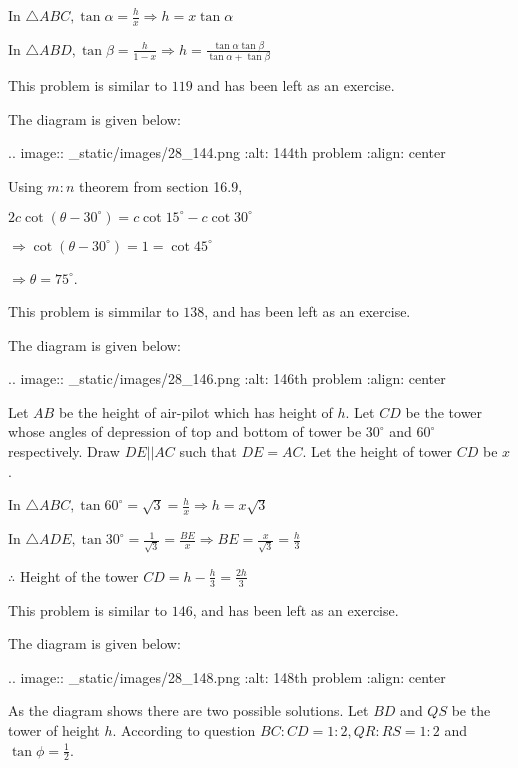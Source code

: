   In $\triangle ABC, \tan\alpha = \frac{h}{x} \Rightarrow h = x\tan\alpha$

  In $\triangle ABD, \tan\beta = \frac{h}{1 - x} \Rightarrow h =
  \frac{\tan\alpha\tan\beta}{\tan\alpha + \tan\beta}$

\item This problem is similar to $119$ and has been left as an exercise.

\item The diagram is given below:

  .. image:: _static/images/28_144.png
  :alt: 144th problem
  :align: center

  Using $m:n$ theorem from section 16.9,

  $2c\cot(\theta - 30^\circ) = c\cot15^\circ - c\cot30^\circ$

  $\Rightarrow \cot(\theta - 30^\circ) = 1 = \cot45^\circ$

  $\Rightarrow \theta = 75^\circ$.

\item This problem is simmilar to $138$, and has been left as an exercise.

\item The diagram is given below:

  .. image:: _static/images/28_146.png
  :alt: 146th problem
  :align: center

  Let $AB$ be the height of air-pilot which has height of $h$. Let $CD$ be the tower
  whose angles of depression of top and bottom of tower be $30^\circ$ and $60^\circ$
  respectively. Draw $DE||AC$ such that $DE = AC$. Let the height of tower $CD$ be
  $x$.

  In $\triangle ABC, \tan60^\circ = \sqrt{3} = \frac{h}{x} \Rightarrow h = x\sqrt{3}$

  In $\triangle ADE, \tan30^\circ = \frac{1}{\sqrt{3}} = \frac{BE}{x}\Rightarrow BE =
  \frac{x}{\sqrt{3}} = \frac{h}{3}$

  $\therefore$ Height of the tower $CD = h - \frac{h}{3} = \frac{2h}{3}$

\item This problem is similar to $146$, and has been left as an exercise.

\item The diagram is given below:

  .. image:: _static/images/28_148.png
  :alt: 148th problem
  :align: center

  As the diagram shows there are two possible solutions. Let $BD$ and $QS$ be the tower of
  height $h$. According to question $BC:CD = 1:2, QR:RS = 1:2$ and $\tan\phi =
  \frac{1}{2}$.

